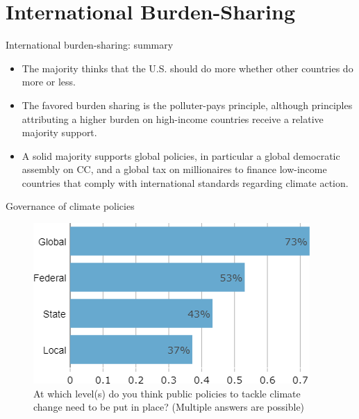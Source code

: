 \documentclass[aspectratio=169,9pt,dvipsnames]{beamer}
\begin{document}
\section{International Burden-Sharing}

\begin{frame}{International burden-sharing: summary}
    \begin{itemize}
        \item The majority thinks that the U.S. should do more whether other countries do more or less.
        \item The favored burden sharing is the polluter-pays principle, although principles attributing a higher burden on high-income countries receive a relative majority support.
        \item A solid majority supports global policies, in particular a global democratic assembly on CC, and a global tax on millionaires to finance low-income countries that comply with international standards regarding climate action.
    \end{itemize}
\end{frame}

\begin{frame}{Governance of climate policies}%
\vspace{-1cm}
\begin{figure}[h!]
\centering
\caption{\small{At which level(s) do you think public policies to tackle climate change need to be put in place? (Multiple answers are possible)}}
\includegraphics[width=.5\textwidth]{../figures/US/scale_US.png}
\end{figure}
\end{frame}
\end{document}
